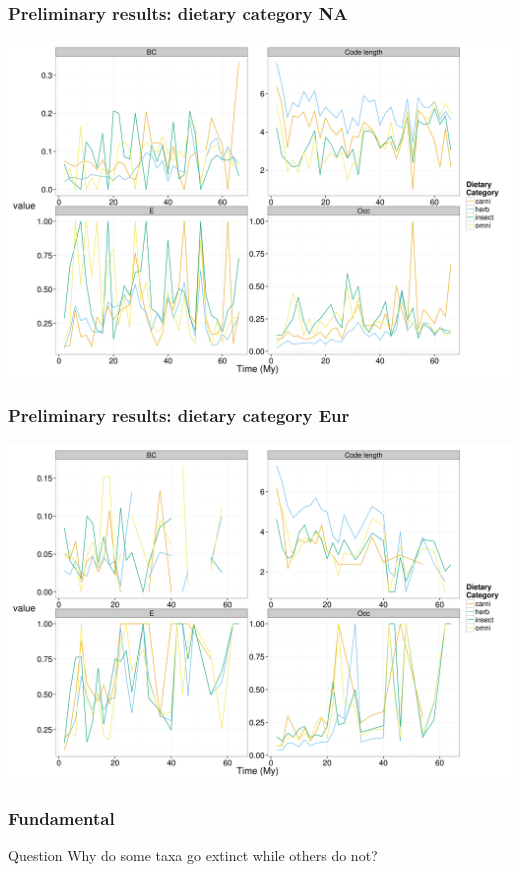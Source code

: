 \documentclass{beamer}
\begin{document}
\begin{frame}
  \frametitle{Preliminary results: dietary category NA}

  \begin{center}
    \includegraphics[height = 0.8\textheight, width = \textwidth, keepaspectratio = true]{figure/na_dt}
  \end{center}
\end{frame}

\begin{frame}
  \frametitle{Preliminary results: dietary category Eur}

  \begin{center}
    \includegraphics[height = 0.8\textheight, width = \textwidth, keepaspectratio = true]{figure/er_dt}
  \end{center}
\end{frame}


\begin{frame}
  \frametitle{Fundamental}

  \begin{alertblock}{Question}
    Why do some taxa go extinct while others do not?
  \end{alertblock}
\end{frame}
\end{document}
